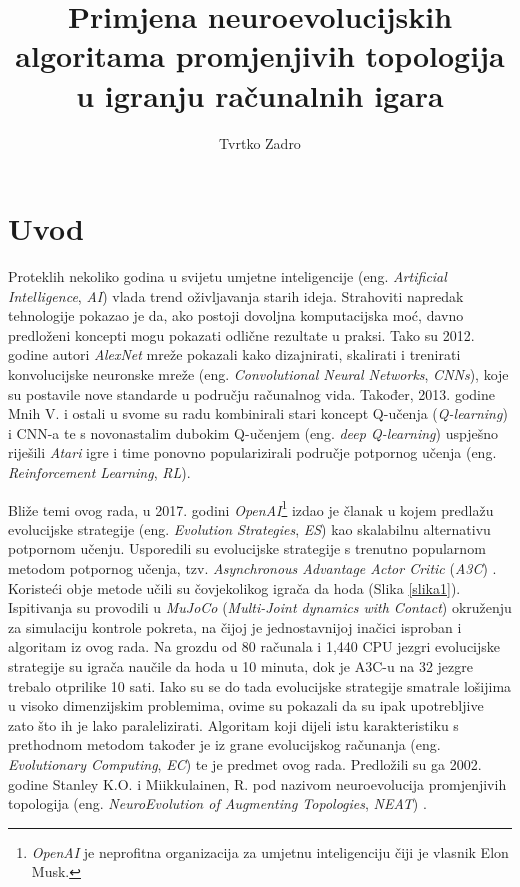 \documentclass[times, utf8, diplomski, numeric]{fer}
\begin{document}
\nocite{*}
\graphicspath{{slike/}}

\title{Primjena neuroevolucijskih algoritama promjenjivih topologija u igranju računalnih igara}
\author{Tvrtko Zadro}
\maketitle

\izvornik

\zahvala{}

\tableofcontents

\chapter{Uvod}
Proteklih nekoliko godina u svijetu umjetne inteligencije (eng. \textit{Artificial Intelligence}, \textit{AI}) vlada trend oživljavanja starih ideja. Strahoviti napredak tehnologije pokazao je da, ako postoji dovoljna komputacijska moć, davno predloženi koncepti mogu pokazati odlične rezultate u praksi. Tako su 2012. godine autori \textit{AlexNet} mreže \citep{rad1} pokazali kako dizajnirati, skalirati i trenirati konvolucijske neuronske mreže (eng. \textit{Convolutional Neural Networks}, \textit{CNNs}), koje su postavile nove standarde u području računalnog vida. Također, 2013. godine Mnih V. i ostali u svome su radu \citep{rad2} kombinirali stari koncept Q-učenja (\textit{Q-learning}) i CNN-a te s novonastalim dubokim Q-učenjem (eng. \textit{deep Q-learning}) uspješno riješili \textit{Atari} igre i time ponovno popularizirali područje potpornog učenja (eng. \textit{Reinforcement Learning}, \textit{RL}).

Bliže temi ovog rada, u 2017. godini \textit{OpenAI}\footnote{\textit{OpenAI} je neprofitna organizacija za umjetnu inteligenciju čiji je vlasnik Elon Musk.} izdao je članak \citep{rad3} u kojem predlažu evolucijske strategije (eng. \textit{Evolution Strategies}, \textit{ES}) kao skalabilnu alternativu potpornom učenju. Usporedili su evolucijske strategije s trenutno popularnom metodom potpornog učenja, tzv. \textit{Asynchronous Advantage Actor Critic} (\textit{A3C}) \citep{rad4}. Koristeći obje metode učili su čovjekolikog igrača da hoda (Slika \ref{slika1}). Ispitivanja su provodili u \textit{MuJoCo} (\textit{Multi-Joint dynamics with Contact}) okruženju za simulaciju kontrole pokreta, na čijoj je jednostavnijoj inačici isproban i algoritam iz ovog rada. Na grozdu od 80 računala i 1,440 CPU jezgri evolucijske strategije su igrača naučile da hoda u 10 minuta, dok je A3C-u na 32 jezgre trebalo otprilike 10 sati. Iako su se do tada evolucijske strategije smatrale lošijima u visoko dimenzijskim problemima, ovime su pokazali da su ipak upotrebljive zato što ih je lako paralelizirati. Algoritam koji dijeli istu karakteristiku s prethodnom metodom također je iz grane evolucijskog računanja (eng. \textit{Evolutionary Computing}, \textit{EC}) te je predmet ovog rada. Predložili su ga 2002. godine Stanley K.O. i Miikkulainen, R. pod nazivom neuroevolucija promjenjivih topologija (eng. \textit{NeuroEvolution of Augmenting Topologies}, \textit{NEAT}) \citep{rad5}.
\end{document}
